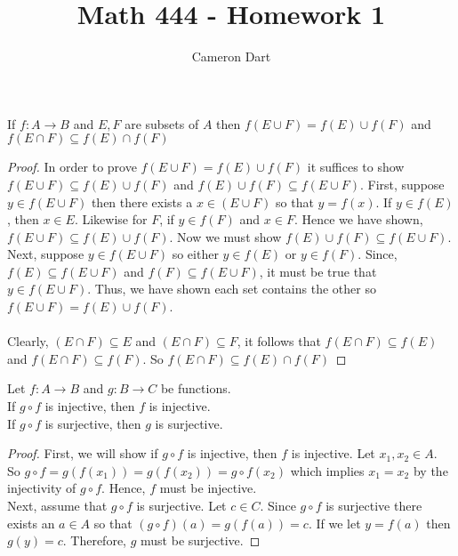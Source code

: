 \documentclass[12pt]{article}
\newenvironment{claim}[2][Claim]{\begin{trivlist}
		\item[\hskip \labelsep {\bfseries #1}\hskip \labelsep {\bfseries #2}]}{\end{trivlist}}
\begin{document}
	\title{Math 444 - Homework 1}
	\author{Cameron Dart}
	\maketitle
	\begin{claim}{1.1.14}
		If $f: A \rightarrow B$ and $E,F$ are subsets of $A$ then $f(E \cup F) = f(E) \cup f(F)$ and $f(E \cap F) \subseteq f(E) \cap f(F)$
 	\end{claim}
	\begin{proof}
		In order to prove $f(E \cup F) = f(E) \cup f(F)$ it suffices to show $f(E \cup F) \subseteq f(E) \cup f(F)$ and $f(E) \cup f(F) \subseteq f(E \cup F)$.
		First, suppose $y \in f(E \cup F)$  then there exists a $x \in (E \cup F)$ so that $y = f(x)$. If $y \in f(E)$, then $x \in E$. Likewise for $F$, if $y \in f(F)$ and $x \in F$. Hence we have shown, $f(E \cup F) \subseteq f(E) \cup f(F)$. Now we must show $f(E) \cup f(F) \subseteq f(E \cup F)$. Next, suppose $y \in f(E \cup F)$ so either $y \in f(E)$ or $y \in f(F)$. Since, $f(E) \subseteq f(E \cup F)$ and $f(F) \subseteq f(E \cup F)$, it must be true that $y \in f(E \cup F)$. Thus, we have shown each set contains the other so $f(E \cup F) = f(E) \cup f(F)$.\\\\
		Clearly, $(E \cap F) \subseteq E$ and $(E \cap F) \subseteq F$, it follows that $f(E \cap F) \subseteq f(E)$ and $f(E \cap F) \subseteq f(F)$. So $f(E \cap F) \subseteq f(E) \cap f(F)$
	\end{proof}

	\begin{claim}{1.1.22}
		Let $f: A \rightarrow B$ and $g: B \rightarrow C$ be functions. \\
		If $g \circ f$ is injective, then $f$ is injective.\\
		If $g \circ f$ is surjective, then $g$ is surjective.	
	\end{claim}
	\begin{proof}
		First, we will show if $g \circ f$ is injective, then $f$ is injective. Let $x_1, x_2 \in A$.\\ So $g \circ f = g(f(x_1)) = g(f(x_2)) = g \circ f (x_2)$ which implies $x_1 = x_2$ by the injectivity of $g \circ f$. Hence, $f$ must be injective.\\
		Next, assume that $g \circ f$ is surjective. Let $c \in C$. Since $g \circ f$ is surjective there exists an $a \in A$ so that $(g \circ f)(a) = g(f(a)) = c$. If we let $y = f(a)$ then $g(y) = c$. Therefore, $g$ must be surjective.
	\end{proof}
	
\end{document}

